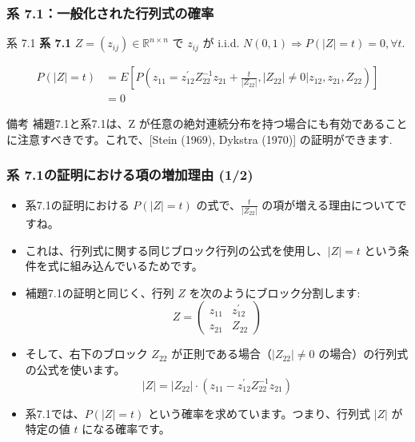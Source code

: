\documentclass[aspectratio=169]{beamer}
\begin{document}
\begin{frame}
\frametitle{系 7.1：一般化された行列式の確率}
\begin{block}{系 7.1}
\textbf{系 7.1} $Z=(z_{ij})\in\mathbb{R}^{n\times n}$ で $z_{ij}$ が i.i.d. $N(0,1)\Rightarrow P(|Z|=t)=0, \forall t$.
\end{block}

\begin{align*} 
P(|Z|=t) &= E[P(z_{11}=z_{12}^{\prime}Z_{22}^{-1}z_{21}+\frac{t}{|Z_{22}|},|Z_{22}|\ne0|z_{12},z_{21},Z_{22})] \\ 
&= 0
\end{align*}


\begin{alertblock}{備考}
補題7.1と系7.1は、Z が任意の絶対連続分布を持つ場合にも有効であることに注意すべきです。これで、[Stein (1969), Dykstra (1970)] の証明ができます.
\end{alertblock}
\end{frame}


\begin{frame}
\frametitle{系 7.1の証明における項の増加理由 (1/2)}
\begin{itemize}
    \item 系7.1の証明における $P(|Z|=t)$ の式で、$\frac{t}{|Z_{22}|}$ の項が増える理由についてですね。
    \item これは、行列式に関する同じブロック行列の公式を使用し、$|Z|=t$ という条件を式に組み込んでいるためです。
    \item 補題7.1の証明と同じく、行列 $Z$ を次のようにブロック分割します:
    \[ Z=\begin{pmatrix}z_{11}&z_{12}^{\prime}\\ z_{21}&Z_{22}\end{pmatrix} \]
    \item そして、右下のブロック $Z_{22}$ が正則である場合（$|Z_{22}|\ne0$ の場合）の行列式の公式を使います。
    \[ |Z|=|Z_{22}|\cdot(z_{11}-z_{12}^{\prime}Z_{22}^{-1}z_{21}) \]
    \item 系7.1では、$P(|Z|=t)$ という確率を求めています。つまり、行列式 $|Z|$ が特定の値 $t$ になる確率です。
\end{itemize}
\end{frame}
\end{document}
